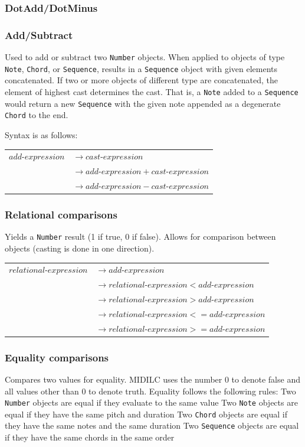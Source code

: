 \documentclass[12pt,A4]{book}
\begin{document}
\subsubsection{DotAdd/DotMinus}

\subsubsection{Add/Subtract}
Used to add or subtract two \verb|Number| objects. When applied to objects of type \verb|Note|, \verb|Chord|, or \verb|Sequence|, results in a \verb|Sequence| object with given elements concatenated. If two or more objects of different type are concatenated, the element of highest cast determines the cast. That is, a \verb|Note| added to a \verb|Sequence| would return a new \verb|Sequence| with the given note appended as a degenerate \verb|Chord| to the end.

Syntax is as follows:\\

\begin{tabular}{l l}
$add\mbox{-}expression$ & $\rightarrow cast\mbox{-}expression$ \\
& $\rightarrow add\mbox{-}expression + cast\mbox{-}expression$\\
& $\rightarrow add\mbox{-}expression - cast\mbox{-}expression$
\end{tabular}

\subsubsection{Relational comparisons}
Yields a \verb|Number| result (1 if true, 0 if false). Allows for comparison between objects (casting is done in one direction).

\begin{tabular}{l l}
$relational\mbox{-}expression$  & $\rightarrow add\mbox{-}expression$\\
& $\rightarrow relational\mbox{-}expression < add\mbox{-}expression$ \\
& $\rightarrow relational\mbox{-}expression > add\mbox{-}expression$ \\
& $\rightarrow relational\mbox{-}expression <= add\mbox{-}expression$ \\
& $\rightarrow relational\mbox{-}expression >= add\mbox{-}expression$ \\
\end{tabular}

\subsubsection{Equality comparisons}
Compares two values for equality. MIDILC uses the number 0 to denote false and all values other than 0 to denote truth. Equality follows the following rules:
Two \verb|Number| objects are equal if they evaluate to the same value
Two \verb|Note| objects are equal if they have the same pitch and duration
Two \verb|Chord| objects are equal if they have the same notes and the same duration
Two \verb|Sequence| objects are equal if they have the same chords in the same order
\end{document}
